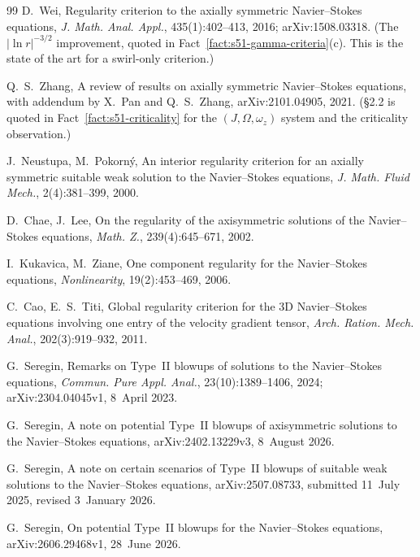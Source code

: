 \documentclass[11pt]{article}
\theoremstyle{definition}
\theoremstyle{remark}
\begin{document}
\begin{thebibliography}{99}
  D.~Wei,
  Regularity criterion to the axially symmetric Navier--Stokes equations,
  \emph{J. Math. Anal. Appl.}, 435(1):402--413, 2016; arXiv:1508.03318.
  (The $|\ln r|^{-3/2}$ improvement, quoted in
  Fact~\ref{fact:s51-gamma-criteria}(c). This is the state of the art for a
  swirl-only criterion.)

  Q.~S.~Zhang,
  A review of results on axially symmetric Navier--Stokes equations, with
  addendum by X.~Pan and Q.~S.~Zhang,
  arXiv:2101.04905, 2021.
  (\S2.2 is quoted in Fact~\ref{fact:s51-criticality} for the
  $(J,\Omega,\omega_z)$ system and the criticality observation.)

  J.~Neustupa, M.~Pokorn\'y,
  An interior regularity criterion for an axially symmetric suitable weak
  solution to the Navier--Stokes equations,
  \emph{J. Math. Fluid Mech.}, 2(4):381--399, 2000.

  D.~Chae, J.~Lee,
  On the regularity of the axisymmetric solutions of the Navier--Stokes
  equations,
  \emph{Math. Z.}, 239(4):645--671, 2002.

  I.~Kukavica, M.~Ziane,
  One component regularity for the Navier--Stokes equations,
  \emph{Nonlinearity}, 19(2):453--469, 2006.

  C.~Cao, E.~S.~Titi,
  Global regularity criterion for the 3D Navier--Stokes equations involving
  one entry of the velocity gradient tensor,
  \emph{Arch. Ration. Mech. Anal.}, 202(3):919--932, 2011.



  G.~Seregin,
  Remarks on Type~II blowups of solutions to the Navier--Stokes equations,
  \emph{Commun. Pure Appl. Anal.}, 23(10):1389--1406, 2024;
  arXiv:2304.04045v1, 8~April 2023.

  G.~Seregin,
  A note on potential Type~II blowups of axisymmetric solutions to the
  Navier--Stokes equations,
  arXiv:2402.13229v3, 8~August 2026.

  G.~Seregin,
  A note on certain scenarios of Type~II blowups of suitable weak solutions to
  the Navier--Stokes equations,
  arXiv:2507.08733, submitted 11~July 2025, revised 3~January 2026.

  G.~Seregin,
  On potential Type~II blowups for the Navier--Stokes equations,
  arXiv:2606.29468v1, 28~June 2026.


\end{thebibliography}
\end{document}
